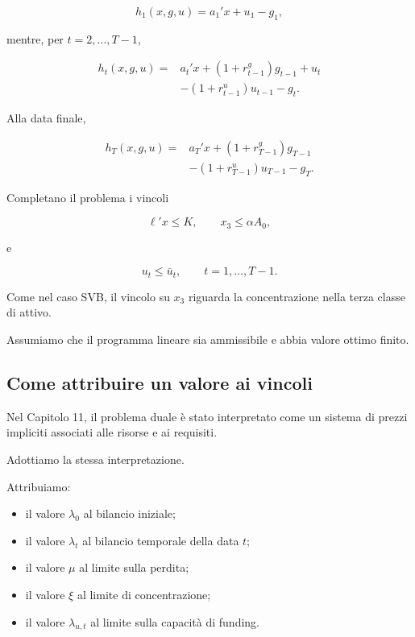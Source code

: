 \[
h_1(x,g,u)=a_1'x+u_1-g_1,
\]

\noindent mentre, per $t=2,\ldots,T-1$,

\[
\begin{aligned}
h_t(x,g,u)
={}&a_t'x
+(1+r_{t-1}^g)g_{t-1}
+u_t\\
&-(1+r_{t-1}^u)u_{t-1}
-g_t.
\end{aligned}
\]

Alla data finale,

\[
\begin{aligned}
h_T(x,g,u)
={}&a_T'x
+(1+r_{T-1}^g)g_{T-1}\\
&-(1+r_{T-1}^u)u_{T-1}
-g_T.
\end{aligned}
\]

Completano il problema i vincoli

\[
\ell'x\leq K,
\qquad
x_3\leq\alpha A_0,
\]

\noindent e

\[
u_t\leq\bar u_t,
\qquad t=1,\ldots,T-1.
\]

Come nel caso SVB, il vincolo su $x_3$
riguarda la concentrazione nella terza
classe di attivo.

Assumiamo che il programma lineare sia
ammissibile e abbia valore ottimo finito.

\subsection{Come attribuire un valore ai vincoli}

Nel Capitolo 11, il problema duale \`{e} stato
interpretato come un sistema di prezzi impliciti
associati alle risorse e ai requisiti.

Adottiamo la stessa interpretazione.

Attribuiamo:

\begin{itemize}

\item il valore $\lambda_0$ al bilancio iniziale;

\item il valore $\lambda_t$ al bilancio temporale
della data $t$;

\item il valore $\mu$ al limite sulla perdita;

\item il valore $\xi$ al limite di concentrazione;

\item il valore $\lambda_{u,t}$ al limite
sulla capacit\`{a} di funding.

\end{itemize}

